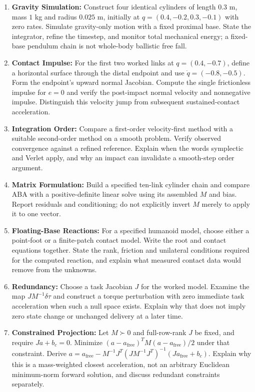 \begin{enumerate}
\item \textbf{Gravity Simulation:} Construct four identical cylinders of length $0.3$ m, mass $1$ kg and radius $0.025$ m, initially at $q=(0.4,-0.2,0.3,-0.1)$ with zero rates. Simulate gravity-only motion with a fixed proximal base. State the integrator, refine the timestep, and monitor total mechanical energy; a fixed-base pendulum chain is not whole-body ballistic free fall.
\item \textbf{Contact Impulse:} For the first two worked links at $q=(0.4,-0.7)$, define a horizontal surface through the distal endpoint and use $\dot q=(-0.8,-0.5)$. Form the endpoint's upward normal Jacobian. Compute the single frictionless impulse for $e=0$ and verify the post-impact normal velocity and nonnegative impulse. Distinguish this velocity jump from subsequent sustained-contact acceleration.
\item \textbf{Integration Order:} Compare a first-order velocity-first method with a suitable second-order method on a smooth problem. Verify observed convergence against a refined reference. Explain when the words symplectic and Verlet apply, and why an impact can invalidate a smooth-step order argument.
\item \textbf{Matrix Formulation:} Build a specified ten-link cylinder chain and compare ABA with a positive-definite linear solve using its assembled $M$ and bias. Report residuals and conditioning; do not explicitly invert $M$ merely to apply it to one vector.
\item \textbf{Floating-Base Reactions:} For a specified humanoid model, choose either a point-foot or a finite-patch contact model. Write the root and contact equations together. State the rank, friction and unilateral conditions required for the computed reaction, and explain what measured contact data would remove from the unknowns.
\item \textbf{Redundancy:} Choose a task Jacobian $J$ for the worked model. Examine the map $JM^{-1}\delta\tau$ and construct a torque perturbation with zero immediate task acceleration when such a null space exists. Explain why that does not imply zero state change or unchanged delivery at a later time.
\item \textbf{Constrained Projection:} Let $M\succ0$ and full-row-rank $J$ be fixed, and require $Ja+b_c=0$. Minimize $(a-a_{\mathrm{free}})^TM(a-a_{\mathrm{free}})/2$ under that constraint. Derive $a=a_{\mathrm{free}}-M^{-1}J^T(JM^{-1}J^T)^{-1}(Ja_{\mathrm{free}}+b_c)$. Explain why this is a mass-weighted closest acceleration, not an arbitrary Euclidean minimum-norm forward solution, and discuss redundant constraints separately.
\end{enumerate}
